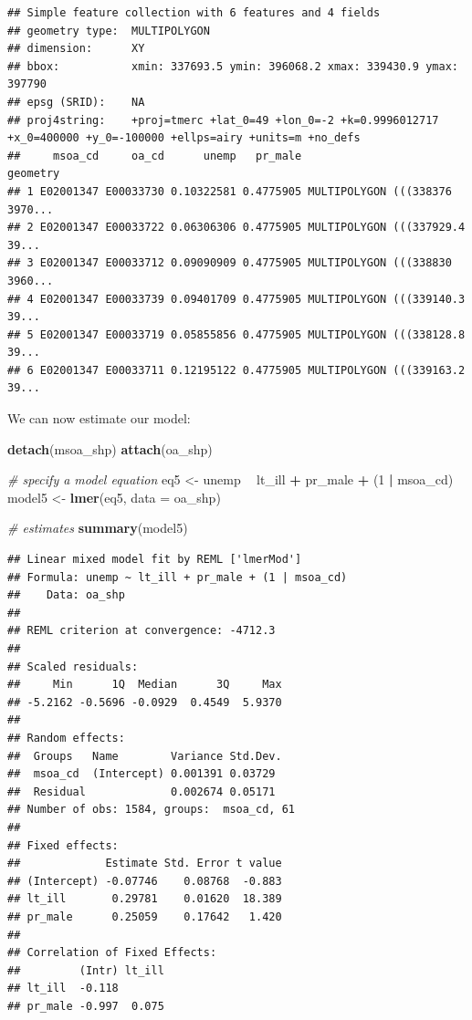 \documentclass[]{book}
\newenvironment{Shaded}{\begin{snugshade}}{\end{snugshade}}
\newcommand{\KeywordTok}[1]{\textcolor[rgb]{0.13,0.29,0.53}{\textbf{#1}}}
\newcommand{\DataTypeTok}[1]{\textcolor[rgb]{0.13,0.29,0.53}{#1}}
\newcommand{\DecValTok}[1]{\textcolor[rgb]{0.00,0.00,0.81}{#1}}
\newcommand{\StringTok}[1]{\textcolor[rgb]{0.31,0.60,0.02}{#1}}
\newcommand{\CommentTok}[1]{\textcolor[rgb]{0.56,0.35,0.01}{\textit{#1}}}
\newcommand{\OperatorTok}[1]{\textcolor[rgb]{0.81,0.36,0.00}{\textbf{#1}}}
\newcommand{\NormalTok}[1]{#1}
\begin{document}
\begin{verbatim}
## Simple feature collection with 6 features and 4 fields
## geometry type:  MULTIPOLYGON
## dimension:      XY
## bbox:           xmin: 337693.5 ymin: 396068.2 xmax: 339430.9 ymax: 397790
## epsg (SRID):    NA
## proj4string:    +proj=tmerc +lat_0=49 +lon_0=-2 +k=0.9996012717 +x_0=400000 +y_0=-100000 +ellps=airy +units=m +no_defs
##     msoa_cd     oa_cd      unemp   pr_male                       geometry
## 1 E02001347 E00033730 0.10322581 0.4775905 MULTIPOLYGON (((338376 3970...
## 2 E02001347 E00033722 0.06306306 0.4775905 MULTIPOLYGON (((337929.4 39...
## 3 E02001347 E00033712 0.09090909 0.4775905 MULTIPOLYGON (((338830 3960...
## 4 E02001347 E00033739 0.09401709 0.4775905 MULTIPOLYGON (((339140.3 39...
## 5 E02001347 E00033719 0.05855856 0.4775905 MULTIPOLYGON (((338128.8 39...
## 6 E02001347 E00033711 0.12195122 0.4775905 MULTIPOLYGON (((339163.2 39...
\end{verbatim}

We can now estimate our model:

\begin{Shaded}
\begin{Highlighting}[]
\KeywordTok{detach}\NormalTok{(msoa_shp)}
\KeywordTok{attach}\NormalTok{(oa_shp)}

\CommentTok{# specify a model equation}
\NormalTok{eq5 <-}\StringTok{ }\NormalTok{unemp }\OperatorTok{~}\StringTok{ }\NormalTok{lt_ill }\OperatorTok{+}\StringTok{ }\NormalTok{pr_male }\OperatorTok{+}\StringTok{ }\NormalTok{(}\DecValTok{1} \OperatorTok{|}\StringTok{ }\NormalTok{msoa_cd)}
\NormalTok{model5 <-}\StringTok{ }\KeywordTok{lmer}\NormalTok{(eq5, }\DataTypeTok{data =}\NormalTok{ oa_shp)}

\CommentTok{# estimates}
\KeywordTok{summary}\NormalTok{(model5)}
\end{Highlighting}
\end{Shaded}

\begin{verbatim}
## Linear mixed model fit by REML ['lmerMod']
## Formula: unemp ~ lt_ill + pr_male + (1 | msoa_cd)
##    Data: oa_shp
## 
## REML criterion at convergence: -4712.3
## 
## Scaled residuals: 
##     Min      1Q  Median      3Q     Max 
## -5.2162 -0.5696 -0.0929  0.4549  5.9370 
## 
## Random effects:
##  Groups   Name        Variance Std.Dev.
##  msoa_cd  (Intercept) 0.001391 0.03729 
##  Residual             0.002674 0.05171 
## Number of obs: 1584, groups:  msoa_cd, 61
## 
## Fixed effects:
##             Estimate Std. Error t value
## (Intercept) -0.07746    0.08768  -0.883
## lt_ill       0.29781    0.01620  18.389
## pr_male      0.25059    0.17642   1.420
## 
## Correlation of Fixed Effects:
##         (Intr) lt_ill
## lt_ill  -0.118       
## pr_male -0.997  0.075
\end{verbatim}
\end{document}
